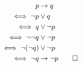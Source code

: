 \documentclass[a4paper]{article}
\begin{document}
\[\begin{aligned}
    p&\to q\\
    \iff\neg p&\lor q\\
    \iff q&\lor\neg p\\
    \iff\neg\neg q&\lor\neg p\\
    \iff\neg(\neg q)&\lor\neg p\\
    \iff\neg q&\to\neg p\qed\\
\end{aligned}\]
\end{document}
